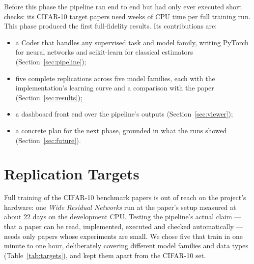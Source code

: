 \documentclass[10pt,twocolumn]{article}
\begin{document}
Before this phase the pipeline ran end to end but had only ever executed short checks: its
CIFAR-10 target papers need weeks of CPU time per full training run. This phase produced the
first full-fidelity results. Its contributions are:

\begin{itemize}
  \item a Coder that handles any supervised task and model family, writing PyTorch for neural
    networks and scikit-learn for classical estimators (Section~\ref{sec:pipeline});
  \item five complete replications across five model families, each with the implementation's
    learning curve and a comparison with the paper (Section~\ref{sec:results});
  \item a dashboard front end over the pipeline's outputs (Section~\ref{sec:viewer});
  \item a concrete plan for the next phase, grounded in what the runs showed
    (Section~\ref{sec:future}).
\end{itemize}

\section{Replication Targets}
\label{sec:targets}

Full training of the CIFAR-10 benchmark papers is out of reach on the project's hardware: one
\emph{Wide Residual Networks} run at the paper's setup measured at about 22 days on the
development CPU. Testing the pipeline's actual claim --- that a paper can be read, implemented,
executed and checked automatically --- needs only papers whose experiments are small. We chose
five that train in one minute to one hour, deliberately covering different model families and
data types (Table~\ref{tab:targets}), and kept them apart from the CIFAR-10 set.
\end{document}
